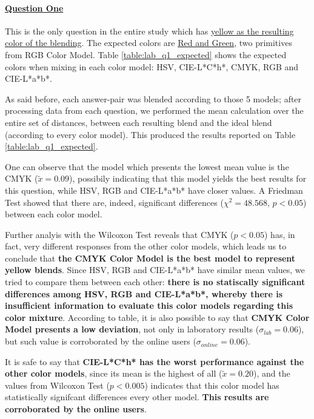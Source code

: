 \paragraph{\ul{Question One}}
%
This is the only question in the entire study which has \ul{yellow as the resulting color of the blending}. The expected colors are \ul{Red and Green}, two primitives from RGB Color Model. Table \ref{table:lab_q1_expected} shows the
expected colors when mixing in each color model: HSV, CIE-L*C*h*, CMYK, RGB and CIE-L*a*b*. \par
%
As said before, each answer-pair was blended according to those 5 models; after processing data from each question, we performed the mean calculation over the entire set of distances, between each resulting blend and the ideal blend (according
to every color model). This produced the results reported on Table \ref{table:lab_q1_expected}. \par
%
One can observe that the model which presents the lowest mean value is the CMYK ($\tilde{x} = 0.09$), possibily indicating that this model yields the best results for this question, while HSV, RGB and CIE-L*a*b* have closer values.
A Friedman Test showed that there are, indeed, significant differences ($\chi^2 = 48.568$, $p < 0.05$) between each color model. \par
%
Further analyis with the Wilcoxon Test reveals that CMYK ($p < 0.05$) has, in fact, very different responses from the other color models, which leads us to conclude that \textbf{the CMYK Color Model is the best model to represent yellow blends}.
Since HSV, RGB and CIE-L*a*b* have similar mean values, we tried to compare them between each other: \textbf{there is no statiscally significant differences among HSV, RGB and CIE-L*a*b*, whereby there is insufficient information to evaluate this
color models regarding this color mixture}. According to table, it is also possible to say that \textbf{CMYK Color Model presents a low deviation}, not only in laboratory results ($\sigma_{lab} = 0.06$), but
such value is corroborated by the online users ($\sigma_{online} = 0.06$). \par
%
It is safe to say that \textbf{CIE-L*C*h* has the worst performance against the other color models}, since its mean is the highest of all ($\tilde{x} = 0.20$), and the values from Wilcoxon Test ($p < 0.005$) indicates that this color model has
statistically signifcant differences every other model. \textbf{This results are corroborated by the online users}.
%
